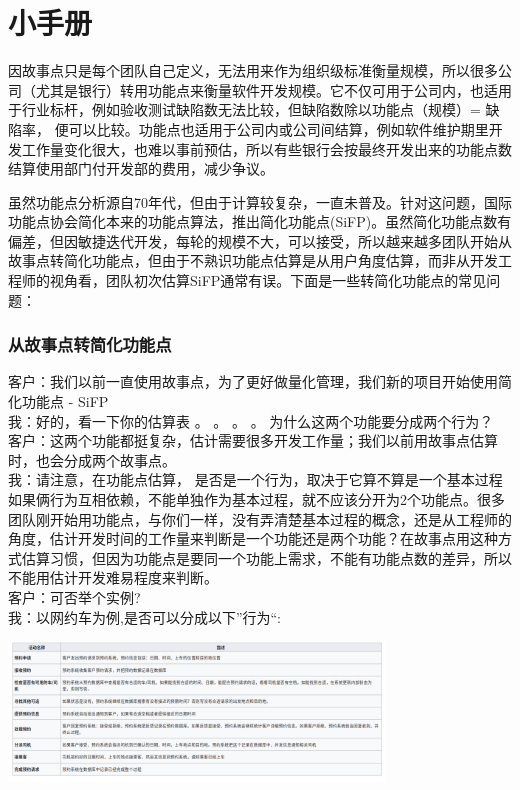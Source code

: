 \chapter{小手册} %


因故事点只是每个团队自己定义，无法用来作为组织级标准衡量规模，所以很多公司（尤其是银行）转用功能点来衡量软件开发规模。它不仅可用于公司内，也适用于行业标杆，例如验收测试缺陷数无法比较，但缺陷数除以功能点（规模）=
缺陷率，
便可以比较。功能点也适用于公司内或公司间结算，例如软件维护期里开发工作量变化很大，也难以事前预估，所以有些银行会按最终开发出来的功能点数结算使用部门付开发部的费用，减少争议。

虽然功能点分析源自70年代，但由于计算较复杂，一直未普及。针对这问题，国际功能点协会简化本来的功能点算法，推出简化功能点(SiFP)。虽然简化功能点数有偏差，但因敏捷迭代开发，每轮的规模不大，可以接受，所以越来越多团队开始从故事点转简化功能点，但由于不熟识功能点估算是从用户角度估算，而非从开发工程师的视角看，团队初次估算SiFP通常有误。下面是一些转简化功能点的常见问题：

\hypertarget{ux4eceux6545ux4e8bux70b9ux8f6cux7b80ux5316ux529fux80fdux70b9}{%
\subsection{从故事点转简化功能点}\label{ux4eceux6545ux4e8bux70b9ux8f6cux7b80ux5316ux529fux80fdux70b9}}

客户：我们以前一直使用故事点，为了更好做量化管理，我们新的项目开始使用简化功能点
- SiFP\\
我：好的，看一下你的估算表 。 。 。 。
为什么这两个功能要分成两个行为？\\
客户：这两个功能都挺复杂，估计需要很多开发工作量；我们以前用故事点估算时，也会分成两个故事点。\\
我：请注意，在功能点估算， 是否是一个行为，取决于它算不算是一个基本过程
如果俩行为互相依赖，不能单独作为基本过程，就不应该分开为2个功能点。很多团队刚开始用功能点，与你们一样，没有弄清楚基本过程的概念，还是从工程师的角度，估计开发时间的工作量来判断是一个功能还是两个功能？在故事点用这种方式估算习惯，但因为功能点是要同一个功能上需求，不能有功能点数的差异，所以不能用估计开发难易程度来判断。\\
客户：可否举个实例?\\
我：以网约车为例,是否可以分成以下''行为``:


\includegraphics[width=10cm]{Screenshotfrom20221219021057.png}

